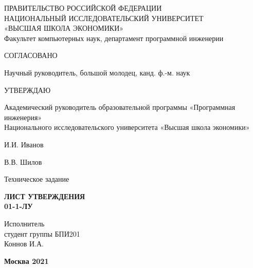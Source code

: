 
ПРАВИТЕЛЬСТВО РОССИЙСКОЙ ФЕДЕРАЦИИ \\
НАЦИОНАЛЬНЫЙ ИССЛЕДОВАТЕЛЬСКИЙ УНИВЕРСИТЕТ \\
«ВЫСШАЯ ШКОЛА ЭКОНОМИКИ» \\
Факультет компьютерных наук, департамент программной инженерии

\bigskip

\begin{minipage}[t]{0.45\textwidth}\centering
	СОГЛАСОВАНО
	
	Научный руководитель,
	большой молодец,
	канд. ф.-м. наук
\end{minipage}%
\hfil%
\begin{minipage}[t]{0.45\textwidth}\centering
	УТВЕРЖДАЮ

	Академический руководитель
	образовательной программы
	«Программная инженерия»\\
	Национального исследовательского
	университета «Высшая школа экономики»
\end{minipage}

\bigskip

\begin{minipage}[t]{0.45\textwidth}\centering
	\placename И.И. Иванов \\
	\placedate
\end{minipage}%
\hfil%
\begin{minipage}[t]{0.45\textwidth}\centering
	\placename В.В. Шилов \\
	\placedate
\end{minipage}%

\vskip 1.5cm

\textbf{\uppercase{\docTitle}}
\bigskip

\bigskip
Техническое задание
\bigskip

\textbf{
	\Large
		ЛИСТ УТВЕРЖДЕНИЯ \\
	\large
		{\docId} 01-1-ЛУ
}

\vspace{3cm}
\begin{flushright}
\begin{varwidth}{\linewidth}\centering
	Исполнитель \\
	студент группы БПИ201 \\
	\placename Коннов И.А. \\
	\placedate
\end{varwidth}
\end{flushright}

\vfill
\textbf{Москва 2021}